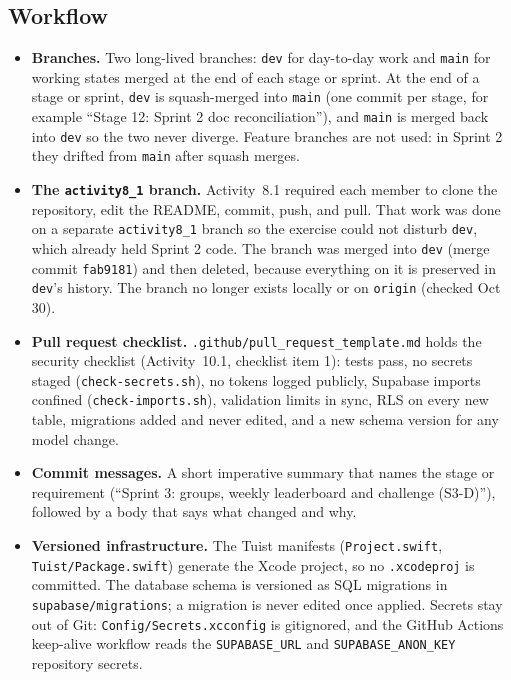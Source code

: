 \documentclass[12pt,letterpaper]{article}
\begin{document}
\subsection{Workflow}
\begin{itemize}
  \item \textbf{Branches.} Two long-lived branches: \texttt{dev} for day-to-day work
        and \texttt{main} for working states merged at the end of each stage or sprint. At the end of a stage or sprint,
        \texttt{dev} is squash-merged into \texttt{main} (one commit per stage, for
        example ``Stage 12: Sprint 2 doc reconciliation''), and \texttt{main} is merged
        back into \texttt{dev} so the two never diverge. Feature branches are not used:
        in Sprint 2 they drifted from \texttt{main} after squash merges.
  \item \textbf{The \texttt{activity8\_1} branch.} Activity~8.1 required each member to
        clone the repository, edit the README, commit, push, and pull. That work was
        done on a separate \texttt{activity8\_1} branch so the exercise could not
        disturb \texttt{dev}, which already held Sprint 2 code. The branch was merged
        into \texttt{dev} (merge commit \texttt{fab9181}) and then deleted, because
        everything on it is preserved in \texttt{dev}'s history. The branch no longer
        exists locally or on \texttt{origin} (checked Oct 30).
  \item \textbf{Pull request checklist.} \texttt{.github/pull\_request\_template.md}
        holds the security checklist (Activity~10.1, checklist item 1): tests pass, no
        secrets staged (\texttt{check-secrets.sh}), no tokens logged publicly, Supabase
        imports confined (\texttt{check-imports.sh}), validation limits in sync, RLS on
        every new table, migrations added and never edited, and a new schema version
        for any model change.
  \item \textbf{Commit messages.} A short imperative summary that names the stage or
        requirement (``Sprint 3: groups, weekly leaderboard and challenge (S3-D)''),
        followed by a body that says what changed and why.
  \item \textbf{Versioned infrastructure.} The Tuist manifests (\texttt{Project.swift},
        \texttt{Tuist/Package.swift}) generate the Xcode project, so no
        \texttt{.xcodeproj} is committed. The database schema is versioned as SQL
        migrations in \texttt{supabase/migrations}; a migration is never edited once
        applied. Secrets stay out of Git: \texttt{Config/Secrets.xcconfig} is
        gitignored, and the GitHub Actions keep-alive workflow reads the
        \texttt{SUPABASE\_URL} and \texttt{SUPABASE\_ANON\_KEY} repository secrets.
\end{itemize}
\end{document}
